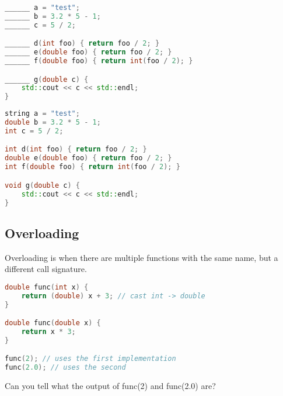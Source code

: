 \documentclass[]{article}
\begin{document}
\begin{minipage}{\linewidth}
    \begin{exercise}
    \begin{lstlisting}[language=C++, numbers=none]
______ a = "test";
______ b = 3.2 * 5 - 1;
______ c = 5 / 2;

______ d(int foo) { return foo / 2; }
______ e(double foo) { return foo / 2; }
______ f(double foo) { return int(foo / 2); }

______ g(double c) { 
    std::cout << c << std::endl;    
}
\end{lstlisting}
\end{exercise}
\end{minipage}

\begin{minipage}{\linewidth}
    \begin{solution}
        \begin{lstlisting}[language=C++, numbers=none]
string a = "test";
double b = 3.2 * 5 - 1;
int c = 5 / 2;

int d(int foo) { return foo / 2; }
double e(double foo) { return foo / 2; }
int f(double foo) { return int(foo / 2); }

void g(double c) { 
    std::cout << c << std::endl;    
}
\end{lstlisting}
    \end{solution}
\end{minipage}

\subsection{Overloading}

\begin{definition}
    Overloading is when there are multiple functions with the same name, but a different call signature.
\end{definition}

\begin{lstlisting}[language=C++]
double func(int x) {
    return (double) x + 3; // cast int -> double 
}

double func(double x) {
    return x * 3;
}

func(2); // uses the first implementation
func(2.0); // uses the second
\end{lstlisting}

\begin{question}
    Can you tell what the output of func(2) and func(2.0) are?
\end{question}
\end{document}
